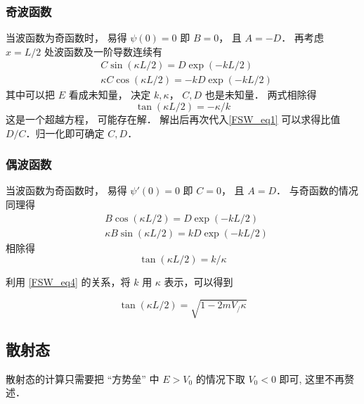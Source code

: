 \subsubsection{奇波函数}
当波函数为奇函数时， 易得 $\psi(0) = 0$ 即 $B = 0$， 且 $A = -D$． 再考虑 $x = L/2$ 处波函数及一阶导数连续有
\begin{equation}\label{FSW_eq1}
\begin{aligned}
&C\sin(\kappa L/2) = D \exp(-kL/2)\\
&\kappa C \cos(\kappa L/2) = -kD \exp(-kL/2)
\end{aligned}
\end{equation}
其中可以把 $E$ 看成未知量， 决定 $k, \kappa$， $C,D$ 也是未知量． 两式相除得
\begin{equation}\label{FSW_eq2}
\tan(\kappa L/2) = -\kappa/k
\end{equation}
这是一个超越方程， 可能存在解． 解出后再次代入\autoref{FSW_eq1} 可以求得比值 $D/C$．归一化即可确定 $C, D$．

\subsubsection{偶波函数}
当波函数为奇函数时， 易得 $\psi'(0) = 0$ 即 $C = 0$， 且 $A = D$． 与奇函数的情况同理得
\begin{equation}
\begin{aligned}
&B\cos(\kappa L/2) = D \exp(-kL/2)\\
&\kappa B \sin(\kappa L/2) = kD \exp(-kL/2)
\end{aligned}
\end{equation}
相除得
\begin{equation}\label{FSW_eq3}
\tan(\kappa L/2) = k/\kappa
\end{equation}

利用 \autoref{FSW_eq4} 的关系，将 $k$ 用 $\kappa$ 表示，可以得到

\begin{equation}
\tan(\kappa L/2)=\sqrt{1-2mV_/\kappa}
\end{equation}


\subsection{散射态}

散射态的计算只需要把 “方势垒” 中 $E > V_0$ 的情况下取 $V_0 < 0$ 即可, 这里不再赘述．
